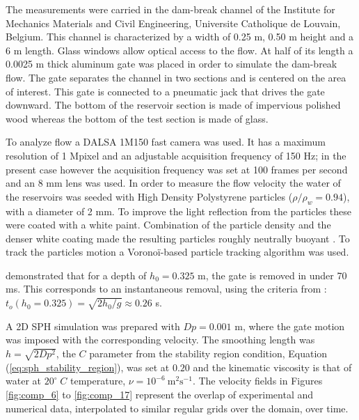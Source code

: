 The measurements were carried in the dam-break channel of the Institute for Mechanics Materials and Civil Engineering, Universite Catholique de Louvain, Belgium. This channel is characterized by a width of 0.25 m, 0.50 m height and a 6 m length. Glass windows allow optical access to the flow. At half of its length a 0.0025 m thick aluminum gate was placed in order to simulate the dam-break flow. The gate separates the channel in two sections and is centered on the area of interest. This gate is connected to a pneumatic jack that drives the gate downward. The bottom of the reservoir section is made of impervious polished wood whereas the bottom of the test section is made of glass. 

To analyze flow a DALSA 1M150 fast camera was used. It has a maximum resolution of 1 Mpixel and an adjustable acquisition frequency of 150 Hz; in the present case however the acquisition frequency was set at 100 frames per second and an 8 mm lens was used. In order to measure the flow velocity the water of the reservoirs was seeded with High Density Polystyrene particles ($\rho/\rho_w = 0.94$), with a diameter of 2 mm. To improve the light reflection from the particles these were coated with a white paint. Combination of the particle density and the denser white coating made the resulting particles roughly neutrally buoyant \citep{aleixo-al-2011}. To track the particles motion a Vorono\"i-based particle tracking algorithm \citep{Capart-2002} was used.

\cite{Aleixo-2013} demonstrated that for a depth of $h_0=0.325$ m, the gate is removed in under 70 ms. This corresponds to an instantaneous removal, using the criteria from \cite{Lauber-1998}: $t_o(h_0=0.325)=\sqrt{2h_0/g}\approx0.26$ s. 

A 2D \ac{SPH} simulation was prepared with $Dp=0.001$ m, where the gate motion was imposed with the corresponding velocity. The smoothing length was $h=\sqrt{2Dp^2}$, the $C$ parameter from the stability region condition, Equation (\eqref{eq:sph_stability_region}), was set at $0.20$ and the kinematic viscosity is that of water at $20^{\circ}\;C$ temperature, $\nu = 10^{-6} \  \mathrm{m^2 s^{-1}}$. The velocity fields in Figures \ref{fig:comp_6} to \ref{fig:comp_17} represent the overlap of experimental and numerical data, interpolated to similar regular grids over the domain, over time. 

